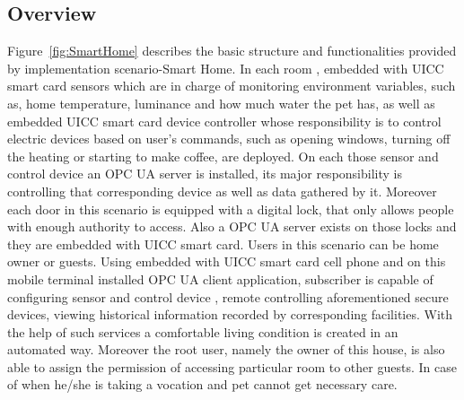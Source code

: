 \documentclass[]{llncs}
\begin{document}
\subsection{Overview}
Figure~\ref{fig:SmartHome} describes the basic structure and functionalities provided by implementation scenario-Smart Home.
In each room , embedded with UICC smart card sensors which are in charge of monitoring environment variables, such as, home temperature, luminance and how much water the pet has, as well as embedded UICC smart card device controller whose responsibility is to control electric devices based on user's commands, such as opening windows, turning off the heating or starting to make coffee, are deployed. On each those sensor and control device an OPC UA server is installed, its major responsibility is controlling that corresponding device as well as data gathered by it.  Moreover each door in this scenario is equipped with a digital lock, that only allows people with enough authority to access. Also a OPC UA server exists on those locks and they are embedded with UICC smart card. Users in this scenario can be home owner or guests. Using embedded with UICC smart card cell phone and on this mobile terminal installed OPC UA client application, subscriber is capable of configuring sensor and control device , remote controlling aforementioned secure devices, viewing historical information recorded by corresponding facilities. With the help of such services a comfortable living condition is created in an automated way.  Moreover the root user, namely the owner of this house, is also able to assign the permission of accessing particular room to other guests. In case of when he/she is taking a vocation and pet cannot get necessary care.
\end{document}
